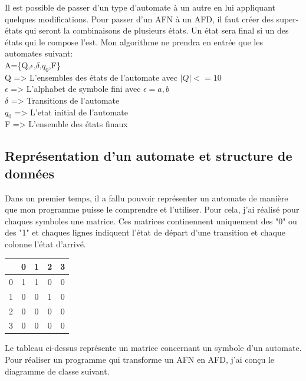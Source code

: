 \documentclass[a4paper]{article}
\begin{document}
Il est possible de passer d'un type d'automate à un autre en lui appliquant quelques modifications. Pour
passer d'un AFN à un AFD, il faut créer des super-états qui seront la combinaisons de plusieurs états.
Un état sera final si un des états qui le compose l'est. Mon algorithme ne 
prendra en entrée que les automates suivant: \\

A=\{Q,$\epsilon$,$\delta$,$q_0$,F\}\\
Q => L'ensembles des états de l'automate avec $|Q|<=10$\\
$\epsilon$ => L'alphabet de symbole fini avec $\epsilon={a,b}$\\
$\delta$ => Transitions de l'automate\\
$q_0$ => L'etat initial de l'automate\\
F => L'ensemble des états finaux\\
\subsection{Représentation d'un automate et structure de données}

Dans un premier temps, il a fallu pouvoir représenter un automate de manière que mon
programme puisse le comprendre et l'utiliser. Pour cela, j'ai réalisé pour
chaques symboles une matrice. Ces matrices continennent uniquement des "0" ou des "1"
et chaques lignes indiquent l'état de départ d'une transition et chaque colonne l'état 
d'arrivé.\\

\begin{center}
   \begin{tabular}{| l ||*{4}{c|} }
     \hline
       & 0 & 1 & 2 & 3 \\ \hline\hline
     0 & 1 & 1 & 0 & 0 \\ \hline
     1 & 0 & 0 & 1 & 0 \\ \hline
     2 & 0 & 0 & 0 & 0 \\ \hline
     3 & 0 & 0 & 0 & 0 \\
     \hline
   \end{tabular}
 \end{center}
Le tableau ci-dessus représente un matrice concernant un symbole d'un automate.\\

Pour réaliser un programme qui transforme un AFN en AFD, j'ai conçu le diagramme de 
classe suivant.\\
\end{document}

